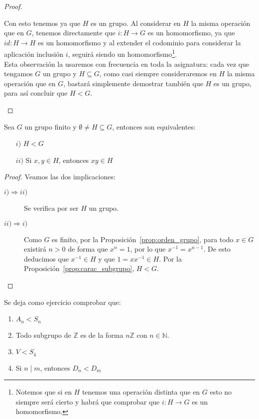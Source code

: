 \begin{prop}
\begin{proof}
\begin{description}
                Con esto tenemos ya que $H$ es un grupo. Al considerar en $H$ la misma operación que en $G$, tenemos directamente que $i:H\to G$ es un homomorfismo, ya que $id:H\to H$ es un homomorfismo y al extender el codominio para considerar la aplicación inclusión $i$, seguirá siendo un homomorfismo\footnote{Notemos que si en $H$ tenemos una operación distinta que en $G$ esto no siempre será cierto y habrá que comprobar que $i:H\to G$ es un homomorfismo.}.\\

                \noindent
                Esta observación la usaremos con frecuencia en toda la asignatura: cada vez que tengamos $G$ un grupo y $H\subseteq G$, como casi siempre consideraremos en $H$ la misma operación que en $G$, bastará simplemente demostrar también que $H$ es un grupo, para así concluir que $H < G$.
        \end{description}
    \end{proof}
\end{prop}

\begin{prop}
    Sea $G$ un grupo finito y $\emptyset \neq H \subseteq G$, entonces son equivalentes:
    \begin{enumerate}
        \item[$i)$] $H < G$
        \item[$ii)$] Si $x,y\in H$, entonces $xy\in H$
    \end{enumerate}
    \begin{proof}
        Veamos las dos implicaciones:
        \begin{description}
            \item [$i)\Longrightarrow ii)$] Se verifica por ser $H$ un grupo.
            \item [$ii)\Longrightarrow i)$] Como $G$ es finito, por la Proposición~\ref{prop:orden_grupo}, para todo $x\in G$ existirá $n>0$ de forma que $x^n = 1$, por lo que $x^{-1} = x^{n-1}$. De esto deducimos que $x^{-1}\in H$ y que $1=xx^{-1}\in H$. Por la Proposición~\ref{prop:carac_subgrupo}, $H<G$.
        \end{description}
    \end{proof}
\end{prop}

\begin{ejemplo}
    Se deja como ejercicio comprobar que:
    \begin{enumerate}
        \item $A_n < S_n$
        \item Todo subgrupo de $\mathbb{Z}$ es de la forma $n\mathbb{Z}$ con $n\in \mathbb{N}$.
        \item $V<S_4$
        \item Si $n\mid m$, entonces $D_n < D_m$
    \end{enumerate}
\end{ejemplo}

